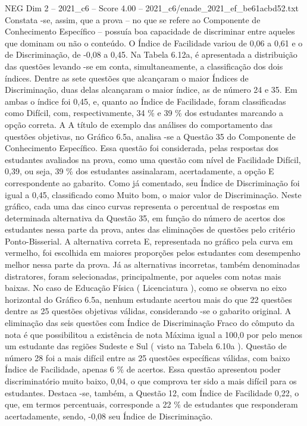 \begin{textsample}{NEG Dim 2 – 2021\_c6 – Score 4.00 – 2021\_c6/enade\_2021\_ef\_be61acbd52.txt}
Constata -se, assim, que a prova – no que se refere ao Componente de Conhecimento Específico – possuía boa capacidade de discriminar entre aqueles que dominam ou não o conteúdo.
O Índice de Facilidade variou de 0,06 a 0,61 e o de Discriminação, de -0,08 a 0,45.
Na Tabela 6.12a, é apresentada a distribuição das questões levando -se em conta, simultaneamente, a classificação dos dois índices.
Dentre as sete questões que alcançaram o maior Índices de Discriminação, duas delas alcançaram o maior índice, as de número 24 e 35.
Em ambas o índice foi 0,45, e, quanto ao Índice de Facilidade, foram classificadas como Difícil, com, respectivamente, 34 \% e 39 \% dos estudantes marcando a opção correta.
A A título de exemplo das análises do comportamento das questões objetivas, no Gráfico 6.5a, analisa -se a Questão 35 do Componente de Conhecimento Específico.
Essa questão foi considerada, pelas respostas dos estudantes avaliados na prova, como uma questão com nível de Facilidade Difícil, 0,39, ou seja, 39 \% dos estudantes assinalaram, acertadamente, a opção E correspondente ao gabarito.
Como já comentado, seu Índice de Discriminação foi igual a 0,45, classificado como Muito bom, o maior valor de Discriminação.
Neste gráfico, cada uma das cinco curvas representa o percentual de respostas em determinada alternativa da Questão 35, em função do número de acertos dos estudantes nessa parte da prova, antes das eliminações de questões pelo critério Ponto-Bisserial.
A alternativa correta E, representada no gráfico pela curva em vermelho, foi escolhida em maiores proporções pelos estudantes com desempenho melhor nessa parte da prova.
Já as alternativas incorretas, também denominadas distratores, foram selecionadas, principalmente, por aqueles com notas mais baixas.
No caso de Educação Física ( Licenciatura ), como se observa no eixo horizontal do Gráfico 6.5a, nenhum estudante acertou mais do que 22 questões dentre as 25 questões objetivas válidas, considerando -se o gabarito original.
A eliminação das seis questões com Índice de Discriminação Fraco do cômputo da nota é que possibilitou a existência de nota Máxima igual a 100,0 por pelo menos um estudante das regiões Sudeste e Sul ( visto na Tabela 6.10a ).
Questão de número 28 foi a mais difícil entre as 25 questões específicas válidas, com baixo Índice de Facilidade, apenas 6 \% de acertos.
Essa questão apresentou poder discriminatório muito baixo, 0,04, o que comprova ter sido a mais difícil para os estudantes.
Destaca -se, também, a Questão 12, com Índice de Facilidade 0,22, o que, em termos percentuais, corresponde a 22 \% de estudantes que responderam acertadamente, sendo, -0,08 seu Índice de Discriminação.

\end{textsample}

